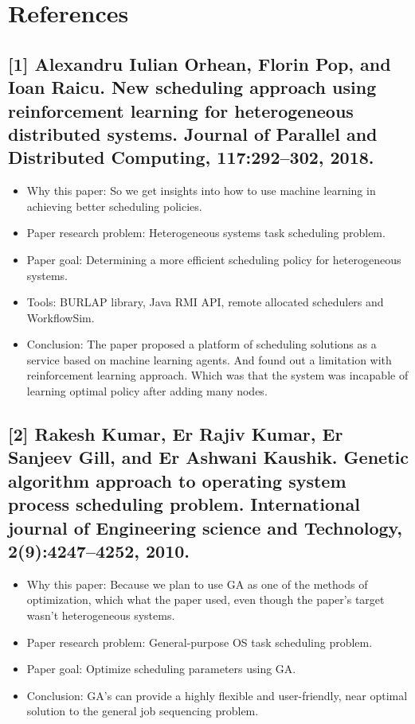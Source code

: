 \documentclass[twocolumn,11pt]{IEEEtran}
\begin{document}
    \section{References}
    \subsection*{[1] Alexandru Iulian Orhean,  Florin  Pop, and Ioan Raicu. New scheduling approach using reinforcement learning for heterogeneous distributed systems. Journal of Parallel and Distributed Computing, 117:292–302, 2018.}
    \begin{itemize}
        \item Why this paper: So we get insights into how to use machine learning in achieving better scheduling policies.
        \item Paper research problem: Heterogeneous systems task scheduling problem.
        \item Paper goal: Determining a more efficient scheduling policy for heterogeneous systems.
        \item Tools: BURLAP library, Java RMI API, remote allocated schedulers and WorkflowSim.
        \item Conclusion: The paper proposed a platform of scheduling solutions as a service based on machine learning agents. 
        And found out a limitation with reinforcement learning approach. Which was that the system was incapable of learning optimal policy after adding many nodes.
    \end{itemize}

    \subsection*{[2] Rakesh Kumar, Er Rajiv Kumar, Er Sanjeev Gill, and Er Ashwani Kaushik. Genetic algorithm approach to operating system process scheduling problem. International journal of Engineering science and Technology, 2(9):4247–4252, 2010.}
    \begin{itemize}
        \item Why this paper: Because we plan to use GA as one of the methods of optimization, which what the paper used,
        even though the paper's target wasn't heterogeneous systems.
        \item Paper research problem: General-purpose OS task scheduling problem.
        \item Paper goal: Optimize scheduling parameters using GA.
        \item Conclusion: GA’s can provide a highly flexible and user-friendly, near optimal solution to the general job sequencing problem.
    \end{itemize}
\end{document}
